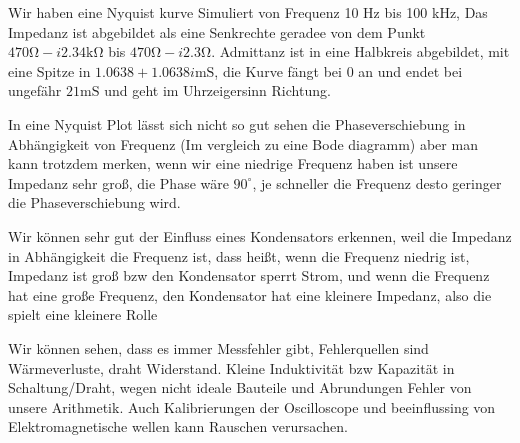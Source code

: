 %
%
Wir haben eine Nyquist kurve Simuliert von Frequenz 10 Hz bis 100 kHz, Das Impedanz ist abgebildet als eine Senkrechte geradee von dem Punkt  $470\si{\ohm }-i2.34 \si{\kilo\ohm}$ bis $470\si{\ohm }-i2.3\si{\ohm}$.
Admittanz ist in eine Halbkreis abgebildet, mit eine Spitze in $1.0638+1.0638i \si{\milli\siemens}$, die Kurve fängt bei $0$ an und endet bei ungefähr $21 \si{\milli\siemens}$ und geht im Uhrzeigersinn Richtung.
\par In eine Nyquist Plot lässt sich nicht so gut sehen die Phaseverschiebung in Abhängigkeit von Frequenz (Im vergleich zu eine Bode diagramm) aber man kann trotzdem merken, wenn wir eine niedrige Frequenz haben ist unsere Impedanz sehr groß, die Phase wäre $90^{\circ}$, je schneller die Frequenz desto geringer die Phaseverschiebung wird.
\par  Wir können sehr gut der Einfluss eines Kondensators erkennen, weil die Impedanz in Abhängigkeit die Frequenz ist, dass
heißt, wenn die Frequenz niedrig ist, Impedanz ist groß bzw den Kondensator sperrt Strom, und wenn die Frequenz hat eine
große Frequenz, den Kondensator hat eine kleinere Impedanz, also die spielt eine kleinere Rolle
\par  Wir können sehen, dass es immer Messfehler gibt, Fehlerquellen sind Wärmeverluste, draht Widerstand. Kleine Induktivität bzw
Kapazität in Schaltung/Draht, wegen nicht ideale Bauteile und Abrundungen Fehler von unsere Arithmetik. Auch Kalibrierungen der Oscilloscope und beeinflussing von Elektromagnetische wellen kann Rauschen verursachen.

%
%
%
\begin{flushright}
\textit{\autorA}
\end{flushright}
%
%
%
%